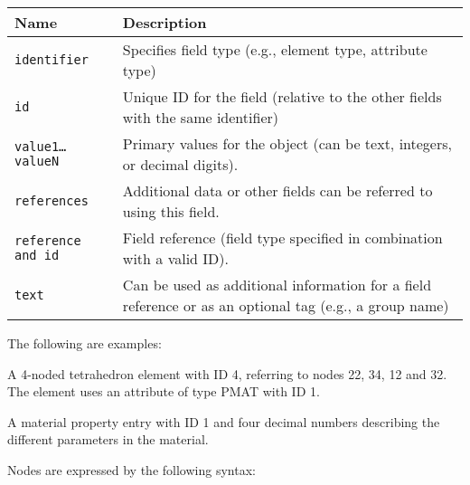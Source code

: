 
\noindent
\begin{tabular}{| m{} | m{} |}
  \hline
  \rowcolor[HTML]{EFEFEF}
  Name             & Description \\
  \hline\hline
  {\tt identifier} & Specifies field type (e.g., element type, attribute type)\\
  \hline
  {\tt id} & Unique ID for the field (relative to the other fields with
             the same identifier) \\
  \hline
  {\tt value1\ldots valueN} & Primary values for the object
                              (can be text, integers, or decimal digits). \\
  \hline
  {\tt references} & Additional data or other fields can be referred to
                     \newline using this field. \\
  \hline
  {\tt reference and id} & Field reference (field type specified in
                           combination with a valid ID). \\
  \hline
  {\tt text} & Can be used as additional information for a field
               \newline reference or as an optional tag (e.g., a group name) \\
  \hline
\end{tabular}

\medskip
The following are examples:


\noindent
A 4-noded tetrahedron element with ID 4, referring to nodes 22, 34, 12 and 32.
The element uses an attribute of type PMAT with ID 1.


\noindent
A material property entry with ID 1 and four decimal numbers describing
the different parameters in the material.




Nodes are expressed by the following syntax:


